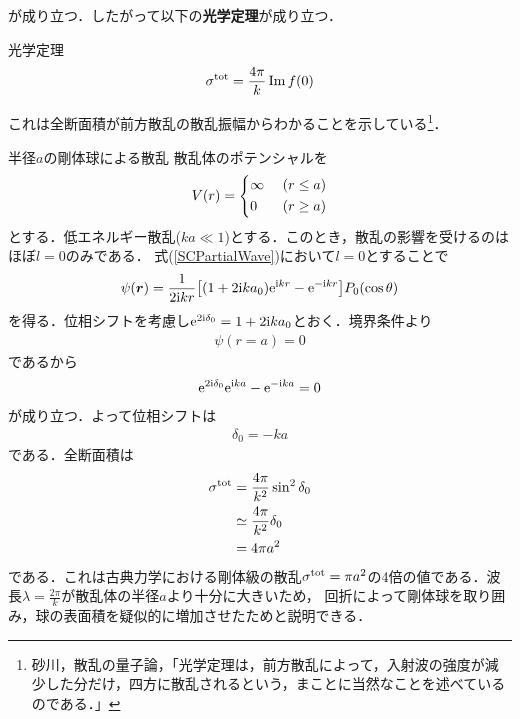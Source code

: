 \documentclass{report}
\begin{document}
  が成り立つ．したがって以下の\textbf{光学定理}が成り立つ．
  \begin{itembox}[l]{光学定理}
    \begin{align}
      \sigma^{\mathrm{tot}} = \frac{4\pi}{k} \Im f(0)
    \end{align}
  \end{itembox}
  これは全断面積が前方散乱の散乱振幅からわかることを示している\footnote{
   砂川，散乱の量子論，「光学定理は，前方散乱によって，入射波の強度が減少した分だけ，四方に散乱されるという，まことに当然なことを述べているのである．」 
  }．
  \begin{myex}{半径$a$の剛体球による散乱}{}
    散乱体のポテンシャルを
    \begin{align}
      V(r) =
      \begin{dcases}
         \infty\ &(r \leq a) \\
        0\ &(r \geq a)
      \end{dcases}
    \end{align}
    とする．低エネルギー散乱($ka \ll 1$)とする．このとき，散乱の影響を受けるのはほぼ$l=0$のみである．
    式(\ref{SCPartialWave})において$l=0$とすることで
    \begin{align}
      \psi(\bm{r}) = \frac{1}{2\mathrm{i} kr}\qty[(1 + 2\mathrm{i} k a_0)\mathrm{e}^{\mathrm{i} kr} - \mathrm{e}^{-\mathrm{i} kr}] P_0(\cos\theta)
    \end{align}
    を得る．位相シフトを考慮し$\mathrm{e}^{2\mathrm{i} \delta_0} = 1 + 2\mathrm{i} ka_0$とおく．境界条件より
    \begin{align}
      \psi(r=a) = 0
    \end{align}
    であるから
    \begin{align}
      \mathrm{e}^{2\mathrm{i} \delta_0}\mathrm{e}^{\mathrm{i} ka} - \mathrm{e}^{-\mathrm{i} ka} = 0
    \end{align}
    が成り立つ．よって位相シフトは
    \begin{align}
      \delta_0 = -ka
    \end{align}
    である．全断面積は
    \begin{align}
      \sigma^{\mathrm{tot}} &= \frac{4\pi}{k^2}\sin^2\delta_0 \\
      &\simeq \frac{4\pi}{k^2}\delta_0 \\
      &= 4\pi a^2
    \end{align}
    である．これは古典力学における剛体級の散乱$\sigma^{\mathrm{tot}}=\pi a^2$の4倍の値である．波長$\lambda=\frac{2\pi}{k}$が散乱体の半径$a$より十分に大きいため，
    回折によって剛体球を取り囲み，球の表面積を疑似的に増加させたためと説明できる．
  \end{myex}
\end{document}
